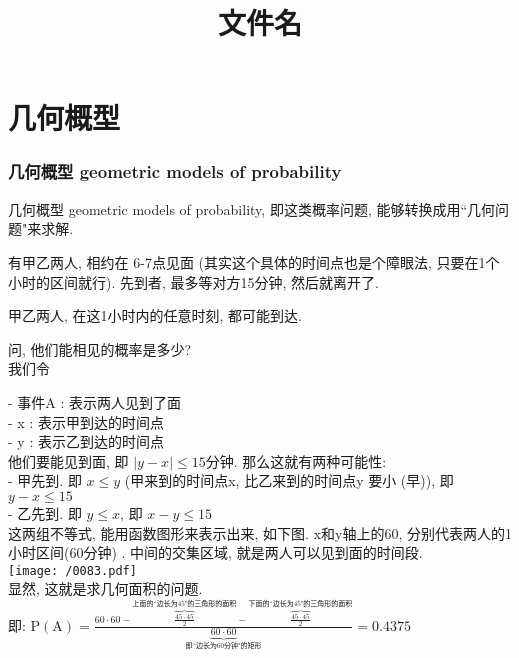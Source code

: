 \documentclass[UTF8]{ctexart}
\title{文件名}
\begin{document}
	\tableofcontents %
	\date{} %
	\maketitle  %
	
	
	
	\part{几何概型}
	
	
	\section{几何概型 geometric models of probability}
	
	
	几何概型 geometric models of probability, 即这类概率问题, 能够转换成用``几何问题"来求解. \\
	
	\begin{myEnvSample}
		有甲乙两人, 相约在 6-7点见面 (其实这个具体的时间点也是个障眼法, 只要在1个小时的区间就行). 先到者, 最多等对方15分钟, 然后就离开了.
		
		甲乙两人, 在这1小时内的任意时刻, 都可能到达.
		
		问, 他们能相见的概率是多少? \\
		
		我们令 
		
		- 事件A : 表示两人见到了面 \\
		- x : 表示甲到达的时间点 \\
		- y : 表示乙到达的时间点 \\
		
		他们要能见到面, 即 $|y-x| \leq 15$分钟. 那么这就有两种可能性: \\
		-  甲先到. 即 $x \leq y$ (甲来到的时间点x, 比乙来到的时间点y 要小 (早)), 即 $ y-x \leq 15$ \\
		-  乙先到. 即 $y \leq x$, 即 $ x-y \leq 15$ \\	
		
		这两组不等式, 能用函数图形来表示出来, 如下图. x和y轴上的60, 分别代表两人的1小时区间(60分钟) . 中间的交集区域, 就是两人可以见到面的时间段. \\
		\texttt{[image: /0083.pdf]} \\
		
		显然, 这就是求几何面积的问题. \\
		
		即: $
		\text{P}\left( \text{A} \right) =\frac{60\cdot 60-\overset{\text{上面的``边长为45"的三角形的面积}}{\overbrace{\frac{45\cdot 45}{2}}}-\overset{\text{下面的``边长为45"的三角形的面积}}{\overbrace{\frac{45\cdot 45}{2}}}}{\underset{\text{即``边长为60分钟"的矩形}}{\underbrace{60\cdot 60}}}=0.4375
		$
	\end{myEnvSample} 
	\vspace{1em} 
	
\end{document}
